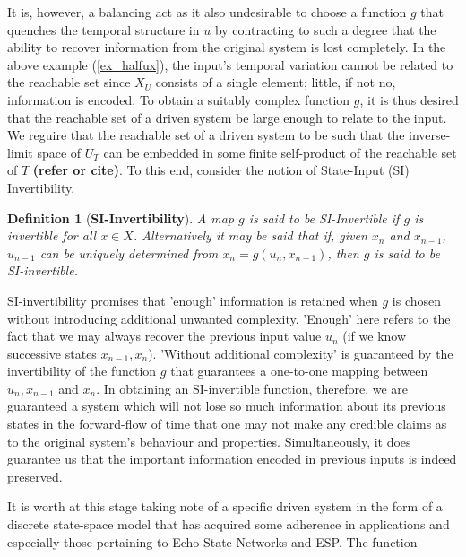 \documentclass[a4paper,12pt,twoside]{report}
\newtheorem{Definition}{Definition}[]
\begin{document}
It is, however, a balancing act as it also undesirable to choose a function $g$ that quenches the temporal structure in $u$ by contracting to such a degree that the ability to recover information from the original system is lost completely.
In the above example (\ref{ex_halfux}), the input's temporal variation cannot be related to the reachable set since $X_U$ consists of a single element; little, if not no, information is encoded.
To obtain a suitably complex function $g$, it is thus desired that the reachable set of a driven system  be large enough to relate to the input. 
 We  reguire that the reachable set of a driven system to be such that the inverse-limit space of $U_T$ can be embedded in some finite self-product of the reachable set of $T$ \textbf{(refer or cite)}. To this end, consider the notion of State-Input (SI) Invertibility.  

\begin{Definition}
  [\bf SI-Invertibility]\label{Dfn_SIinv}\rm
  A map $g$ is said to be SI-Invertible if $g$ is invertible for all $x\in{X}$. Alternatively it may be said that if, given $x_n$ and $x_{n-1}$, $u_{n-1}$ can be uniquely determined from $x_n=g(u_n,x_{n-1})$, then $g$ is said to be SI-invertible.
\end{Definition}
 
SI-invertibility promises that 'enough' information is retained when $g$ is chosen without introducing additional unwanted complexity.  
'Enough' here refers to the fact that we may always recover the previous input value $u_n$ (if we know successive states $x_{n-1}, x_n$).
'Without additional complexity' is guaranteed by the invertibility of the function $g$ that guarantees a one-to-one mapping between $u_n, x_{n-1}$ and $x_n$. 
In obtaining an SI-invertible function, therefore, we are guaranteed a system which will not lose so much information about its previous states in the forward-flow of time that one may not make any credible claims as to the original system's behaviour and properties. 
Simultaneously, it does guarantee us that the important information encoded in previous inputs is indeed preserved.

It is worth at this stage taking note of a specific driven system in the form of a discrete state-space model that has acquired some adherence in applications \cite{Manju_IEEE} and especially those pertaining to Echo State Networks and ESP. The function 
\end{document}

